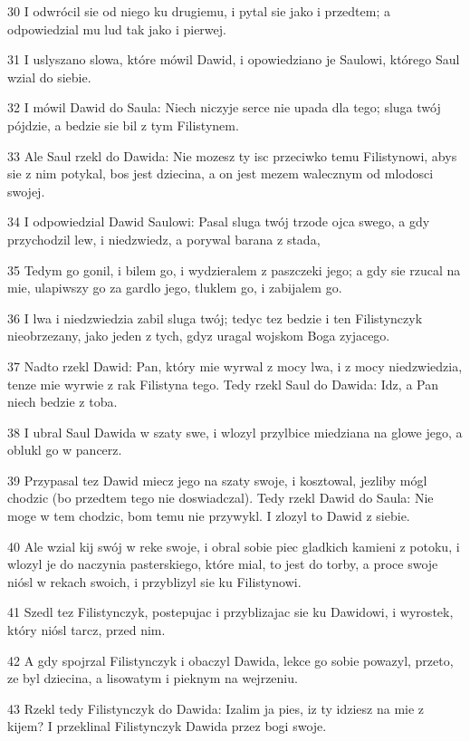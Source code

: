 \par 30 I odwrócil sie od niego ku drugiemu, i pytal sie jako i przedtem; a odpowiedzial mu lud tak jako i pierwej.
\par 31 I uslyszano slowa, które mówil Dawid, i opowiedziano je Saulowi, którego Saul wzial do siebie.
\par 32 I mówil Dawid do Saula: Niech niczyje serce nie upada dla tego; sluga twój pójdzie, a bedzie sie bil z tym Filistynem.
\par 33 Ale Saul rzekl do Dawida: Nie mozesz ty isc przeciwko temu Filistynowi, abys sie z nim potykal, bos jest dziecina, a on jest mezem walecznym od mlodosci swojej.
\par 34 I odpowiedzial Dawid Saulowi: Pasal sluga twój trzode ojca swego, a gdy przychodzil lew, i niedzwiedz, a porywal barana z stada,
\par 35 Tedym go gonil, i bilem go, i wydzieralem z paszczeki jego; a gdy sie rzucal na mie, ulapiwszy go za gardlo jego, tluklem go, i zabijalem go.
\par 36 I lwa i niedzwiedzia zabil sluga twój; tedyc tez bedzie i ten Filistynczyk nieobrzezany, jako jeden z tych, gdyz uragal wojskom Boga zyjacego.
\par 37 Nadto rzekl Dawid: Pan, który mie wyrwal z mocy lwa, i z mocy niedzwiedzia, tenze mie wyrwie z rak Filistyna tego. Tedy rzekl Saul do Dawida: Idz, a Pan niech bedzie z toba.
\par 38 I ubral Saul Dawida w szaty swe, i wlozyl przylbice miedziana na glowe jego, a oblukl go w pancerz.
\par 39 Przypasal tez Dawid miecz jego na szaty swoje, i kosztowal, jezliby mógl chodzic (bo przedtem tego nie doswiadczal). Tedy rzekl Dawid do Saula: Nie moge w tem chodzic, bom temu nie przywykl. I zlozyl to Dawid z siebie.
\par 40 Ale wzial kij swój w reke swoje, i obral sobie piec gladkich kamieni z potoku, i wlozyl je do naczynia pasterskiego, które mial, to jest do torby, a proce swoje niósl w rekach swoich, i przyblizyl sie ku Filistynowi.
\par 41 Szedl tez Filistynczyk, postepujac i przyblizajac sie ku Dawidowi, i wyrostek, który niósl tarcz, przed nim.
\par 42 A gdy spojrzal Filistynczyk i obaczyl Dawida, lekce go sobie powazyl, przeto, ze byl dziecina, a lisowatym i pieknym na wejrzeniu.
\par 43 Rzekl tedy Filistynczyk do Dawida: Izalim ja pies, iz ty idziesz na mie z kijem? I przeklinal Filistynczyk Dawida przez bogi swoje.
